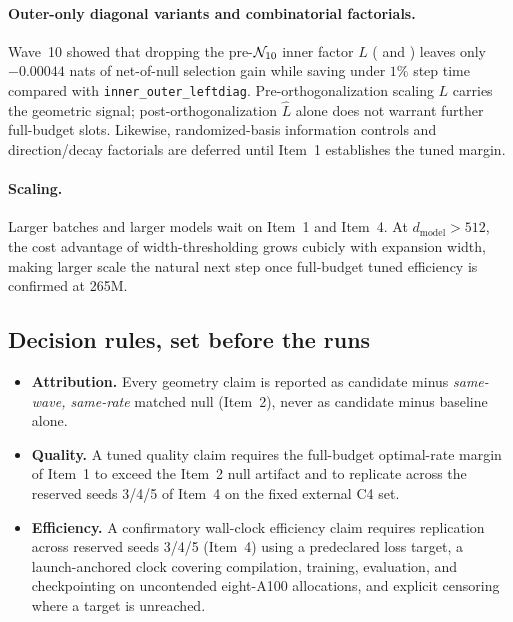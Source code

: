 \paragraph{Outer-only diagonal variants and combinatorial factorials.}
Wave~10 showed that dropping the pre-$\mathcal{N}_{10}$ inner factor $L$ (\outerdiag{} and
\fused{}) leaves only $-0.00044$ nats of net-of-null selection gain while saving
under $1\%$ step time compared with \texttt{inner\_\allowbreak outer\_\allowbreak leftdiag}.
Pre-orthogonalization scaling $L$ carries the geometric signal; post-orthogonalization $\hat L$ alone
does not warrant further full-budget slots. Likewise, randomized-basis
information controls and direction/decay factorials are deferred until Item~1
establishes the tuned margin.

\paragraph{Scaling.}
Larger batches and larger models wait on Item~1 and Item~4. At $d_{\text{model}}
> 512$, the cost advantage of width-thresholding grows cubicly with expansion
width, making larger scale the natural next step once full-budget tuned
efficiency is confirmed at 265M.

\subsection{Decision rules, set before the runs}

\begin{itemize}
\item \textbf{Attribution.} Every geometry claim is reported as candidate minus
  \emph{same-wave, same-rate} matched null (Item~2), never as candidate minus
  baseline alone.
\item \textbf{Quality.} A tuned quality claim requires the full-budget
  optimal-rate margin of Item~1 to exceed the Item~2 null artifact and to
  replicate across the reserved seeds 3/4/5 of Item~4 on the fixed external C4
  set.
\item \textbf{Efficiency.} A confirmatory wall-clock efficiency claim requires
  replication across reserved seeds 3/4/5 (Item~4) using a predeclared loss
  target, a launch-anchored clock covering compilation, training, evaluation, and
  checkpointing on uncontended eight-A100 allocations, and explicit censoring
  where a target is unreached.
\end{itemize}
